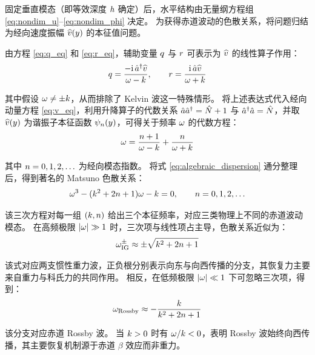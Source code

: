 固定垂直模态（即等效深度 $h$ 确定）后，水平结构由无量纲方程组 \eqref{eq:nondim_u}--\eqref{eq:nondim_phi} 决定。
为获得赤道波动的色散关系，将问题归结为经向速度振幅 $\widehat{v}(y)$ 的本征值问题。

由方程 \eqref{eq:q_eq} 和 \eqref{eq:r_eq}，辅助变量 $q$ 与 $r$ 可表示为 $\widehat{v}$ 的线性算子作用：
\begin{equation}
    q = \frac{-\mathrm{i}\,\hat{a}^{\dagger} \widehat{v}}{\omega - k},
    \qquad
    r = \frac{\mathrm{i}\,\hat{a} \widehat{v}}{\omega + k}
    \label{eq:qr_solution}
\end{equation}

其中假设 $\omega \neq \pm k$，从而排除了 Kelvin 波这一特殊情形。
将上述表达式代入经向动量方程 \eqref{eq:v_eq}，利用升降算子的代数关系 $\hat{a}\hat{a}^{\dagger} = \hat{N} + 1$ 与 $\hat{a}^{\dagger}\hat{a} = \hat{N}$，并取 $\widehat{v}(y)$ 为谐振子本征函数 $\psi_{n}(y)$，可得关于频率 $\omega$ 的代数方程：
\begin{equation}
    \omega = \frac{n+1}{\omega-k} + \frac{n}{\omega+k}
    \label{eq:algebraic_dispersion}
\end{equation}

其中 $n = 0,1,2,\ldots$ 为经向模态指数。
将式 \eqref{eq:algebraic_dispersion} 通分整理后，得到著名的 Matsuno 色散关系：
\begin{equation}
    \omega^3 - (k^2 + 2n + 1)\omega - k = 0,
    \qquad n = 0,1,2,\ldots
    \label{eq:matsuno_dispersion}
\end{equation}

该三次方程对每一组 $(k, n)$ 给出三个本征频率，对应三类物理上不同的赤道波动模态。
在高频极限 $\lvert \omega \rvert \gg 1$ 时，三次项与线性项占主导，色散关系近似为：
\begin{equation}
    \omega_{\mathrm{IG}}^{\pm} \approx \pm\sqrt{k^2 + 2n + 1}
    \label{eq:IG_dispersion}
\end{equation}

该式对应两支惯性重力波，正负根分别表示向东与向西传播的分支，其恢复力主要来自重力与科氏力的共同作用。
相反，在低频极限 $\lvert \omega \rvert \ll 1$ 下可忽略三次项，得到：
\begin{equation}
    \omega_{\mathrm{Rossby}} \approx -\frac{k}{k^2 + 2n + 1}
    \label{eq:Rossby_dispersion}
\end{equation}

该分支对应赤道 Rossby 波。
当 $k > 0$ 时有 $\omega/k < 0$，表明 Rossby 波始终向西传播，其主要恢复机制源于赤道 $\beta$ 效应而非重力。

